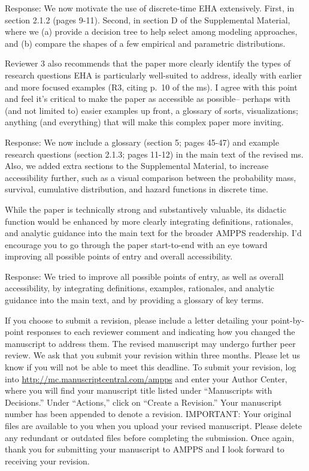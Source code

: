 \documentclass[
]{article}
\renewenvironment{quote}{\begin{leftbar}}{\end{leftbar}}
\begin{document}
Response: We now motivate the use of discrete-time EHA extensively.
First, in section 2.1.2 (pages 9-11). Second, in section D of the
Supplemental Material, where we (a) provide a decision tree to help
select among modeling approaches, and (b) compare the shapes of a few
empirical and parametric distributions.

\begin{quote}
Reviewer 3 also recommends that the paper more clearly identify the
types of research questions EHA is particularly well-suited to address,
ideally with earlier and more focused examples (R3, citing p.~10 of the
ms). I agree with this point and feel it's critical to make the paper as
accessible as possible-- perhaps with (and not limited to) easier
examples up front, a glossary of sorts, visualizations; anything (and
everything) that will make this complex paper more inviting.
\end{quote}

Response: We now include a glossary (section 5; pages 45-47) and example
research questions (section 2.1.3; pages 11-12) in the main text of the
revised ms. Also, we added extra sections to the Supplemental Material,
to increase accessibility further, such as a visual comparison between
the probability mass, survival, cumulative distribution, and hazard
functions in discrete time.

\begin{quote}
While the paper is technically strong and substantively valuable, its
didactic function would be enhanced by more clearly integrating
definitions, rationales, and analytic guidance into the main text for
the broader AMPPS readership. I'd encourage you to go through the paper
start-to-end with an eye toward improving all possible points of entry
and overall accessibility.
\end{quote}

Response: We tried to improve all possible points of entry, as well as
overall accessibility, by integrating definitions, examples, rationales,
and analytic guidance into the main text, and by providing a glossary of
key terms.

\begin{quote}
If you choose to submit a revision, please include a letter detailing
your point-by-point responses to each reviewer comment and indicating
how you changed the manuscript to address them. The revised manuscript
may undergo further peer review. We ask that you submit your revision
within three months. Please let us know if you will not be able to meet
this deadline. To submit your revision, log into
\url{http://mc.manuscriptcentral.com/ampps} and enter your Author
Center, where you will find your manuscript title listed under
``Manuscripts with Decisions.'' Under ``Actions,'' click on ``Create a
Revision.'' Your manuscript number has been appended to denote a
revision. IMPORTANT: Your original files are available to you when you
upload your revised manuscript. Please delete any redundant or outdated
files before completing the submission. Once again, thank you for
submitting your manuscript to AMPPS and I look forward to receiving your
revision.
\end{quote}
\end{document}
